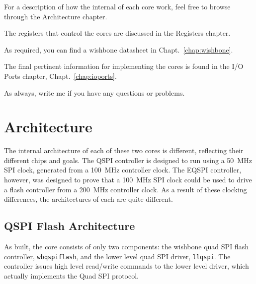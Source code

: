 \documentclass{gqtekspec}
\begin{document}
For a description of how the internal of each core work, feel free to browse
through the Architecture chapter.

The registers that control the cores are discussed in the Registers chapter.

As required, you can find a wishbone datasheet in Chapt.~\ref{chap:wishbone}.

The final pertinent information for implementing the cores is found in the
I/O Ports chapter, Chapt.~\ref{chap:ioports}.

As always, write me if you have any questions or problems.

\chapter{Architecture}\label{chap:arch}

The internal architecture of each of these two cores is different, reflecting
their different chips and goals.  The QSPI controller is designed to run using
a 50~MHz SPI clock, generated from a 100~MHz controller clock.  The EQSPI
controller, however, was designed to prove that a 100~MHz SPI clock could be
used to drive a flash controller from a 200~MHz controller clock.  As a result
of these clocking differences, the architectures of each are quite different.

\section{QSPI Flash Architecture}
As built, the core consists of only two components: the wishbone quad SPI
flash controller, {\tt wbqspiflash}, and the lower level quad SPI driver,
{\tt llqspi}.  The controller issues high level read/write commands to the
lower level driver, which actually implements the Quad SPI protocol.
\end{document}

